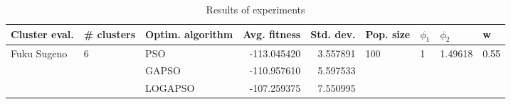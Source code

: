 \begin{table}
\centering
\caption{Results of experiments}
\begin{tabular}{lllrrllll}
\toprule
               Cluster eval. &        \# clusters & Optim. algorithm &  Avg. fitness &  Std. dev. &            Pop. size &         $\phi_{1}$ &               $\phi_{2}$ &                     w \\
\midrule
\multirow{3}{*}{Fuku Sugeno} & \multirow{3}{*}{6} &              PSO &   -113.045420 &   3.557891 & \multirow{3}{*}{100} & \multirow{3}{*}{1} & \multirow{3}{*}{1.49618} & \multirow{3}{*}{0.55} \\
                             &                    &            GAPSO &   -110.957610 &   5.597533 &                      &                    &                          &                       \\
                             &                    &          LOGAPSO &   -107.259375 &   7.550995 &                      &                    &                          &                       \\
\bottomrule
\end{tabular}
\end{table}
